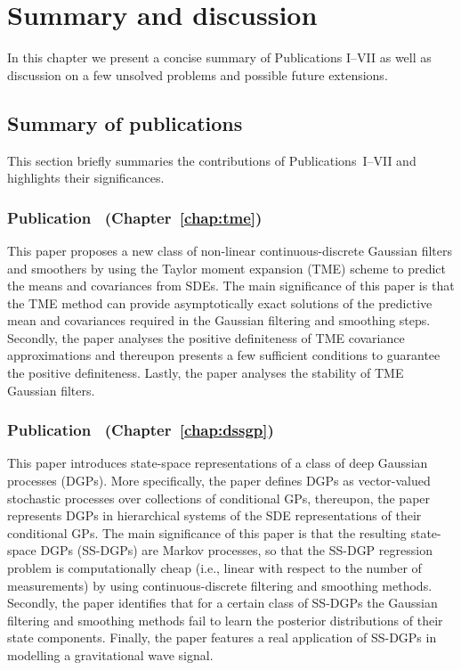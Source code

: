 \chapter{Summary and discussion}
\label{chap:summary}
In this chapter we present a concise summary of Publications I--VII as well as discussion on a few unsolved problems and possible future extensions.

\section{Summary of publications}
This section briefly summaries the contributions of Publications~I--VII and highlights their significances.

\subsection*{Publication~ (Chapter~\ref{chap:tme})}
This paper proposes a new class of non-linear continuous-discrete Gaussian filters and smoothers by using the Taylor moment expansion (TME) scheme to predict the means and covariances from SDEs. The main significance of this paper is that the TME method can provide asymptotically exact solutions of the predictive mean and covariances required in the Gaussian filtering and smoothing steps. Secondly, the paper analyses the positive definiteness of TME covariance approximations and thereupon presents a few sufficient conditions to guarantee the positive definiteness. Lastly, the paper analyses the stability of TME Gaussian filters.

\subsection*{Publication~ (Chapter~\ref{chap:dssgp})}
This paper introduces state-space representations of a class of deep Gaussian processes (DGPs). More specifically, the paper defines DGPs as vector-valued stochastic processes over collections of conditional GPs, thereupon, the paper represents DGPs in hierarchical systems of the SDE representations of their conditional GPs. The main significance of this paper is that the resulting state-space DGPs (SS-DGPs) are Markov processes, so that the SS-DGP regression problem is computationally cheap (i.e., linear with respect to the number of measurements) by using continuous-discrete filtering and smoothing methods. Secondly, the paper identifies that for a certain class of SS-DGPs the Gaussian filtering and smoothing methods fail to learn the posterior distributions of their state components. Finally, the paper features a real application of SS-DGPs in modelling a gravitational wave signal. 


